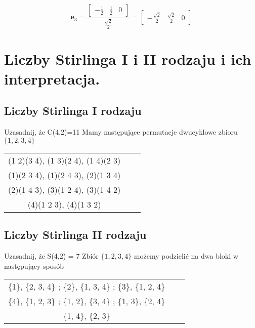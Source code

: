 \documentclass[main.tex]{subfiles}
\begin{document}
    \[
        \mathbf{e}_3 =
        \frac
        {\begin{bmatrix}
             -\frac{1}{2} & \frac{1}{2} & 0
        \end{bmatrix}}
        {\frac{\sqrt{2}}{2}}
        =
        \begin{bmatrix}
            -\frac{\sqrt{2}}{2} & \frac{\sqrt{2}}{2} & 0
        \end{bmatrix}
    \]

    \newpage

    \section{Liczby Stirlinga I i II rodzaju i ich interpretacja.}
    \subsection{Liczby Stirlinga I rodzaju}
    Uzasadnij, że C(4,2)=11\newline
    Mamy następujące permutacje dwucyklowe zbioru $\{1, 2, 3, 4\}$ \newline

    \begin{center}
        \begin{tabular}{ c c c }
            (1 2)(3 4), (1 3)(2 4), (1 4)(2 3)\\
            (1)(2 3 4), (1)(2 4 3), (2)(1 3 4)\\
            (2)(1 4 3), (3)(1 2 4), (3)(1 4 2)\\
            (4)(1 2 3), (4)(1 3 2)
        \end{tabular}
    \end{center}

    \subsection{Liczby Stirlinga II rodzaju}
    Uzasadnij, że S(4,2) = 7 \newline
    Zbiór $\{1,2,3,4\}$ możemy podzielić na dwa bloki w następujący sposób

    \begin{center}
        \begin{tabular}{ c c c }
            \{1\}, \{2, 3, 4\} ; \{2\}, \{1, 3, 4\} ; \{3\}, \{1, 2, 4\} \\
            \{4\}, \{1, 2, 3\} ; \{1, 2\}, \{3, 4\} ; \{1, 3\}, \{2, 4\} \\
            \{1, 4\}, \{2, 3\}
        \end{tabular}
    \end{center}
    \newpage
\end{document}
